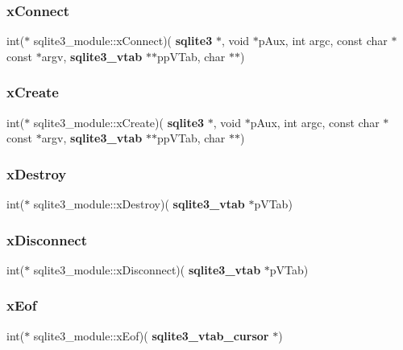 \subsubsection{xConnect}
{\footnotesize\ttfamily int($\ast$ sqlite3\+\_\+module\+::x\+Connect)(\textbf{ sqlite3} $\ast$, void $\ast$p\+Aux, int argc, const char $\ast$const $\ast$argv, \textbf{ sqlite3\+\_\+vtab} $\ast$$\ast$pp\+V\+Tab, char $\ast$$\ast$)}

\mbox{\label{structsqlite3__module_a95e327c9d32abd731013395d9e12b8f9}} 
\subsubsection{xCreate}
{\footnotesize\ttfamily int($\ast$ sqlite3\+\_\+module\+::x\+Create)(\textbf{ sqlite3} $\ast$, void $\ast$p\+Aux, int argc, const char $\ast$const $\ast$argv, \textbf{ sqlite3\+\_\+vtab} $\ast$$\ast$pp\+V\+Tab, char $\ast$$\ast$)}

\mbox{\label{structsqlite3__module_a296dae8dadd4eb1f7d0f1187650c7aa5}} 
\subsubsection{xDestroy}
{\footnotesize\ttfamily int($\ast$ sqlite3\+\_\+module\+::x\+Destroy)(\textbf{ sqlite3\+\_\+vtab} $\ast$p\+V\+Tab)}

\mbox{\label{structsqlite3__module_a5dbaa6ff075eaff25ccfddaedba06934}} 
\subsubsection{xDisconnect}
{\footnotesize\ttfamily int($\ast$ sqlite3\+\_\+module\+::x\+Disconnect)(\textbf{ sqlite3\+\_\+vtab} $\ast$p\+V\+Tab)}

\mbox{\label{structsqlite3__module_ae10cf7d9a7edfecf1daa34a214bf6a64}} 
\subsubsection{xEof}
{\footnotesize\ttfamily int($\ast$ sqlite3\+\_\+module\+::x\+Eof)(\textbf{ sqlite3\+\_\+vtab\+\_\+cursor} $\ast$)}

